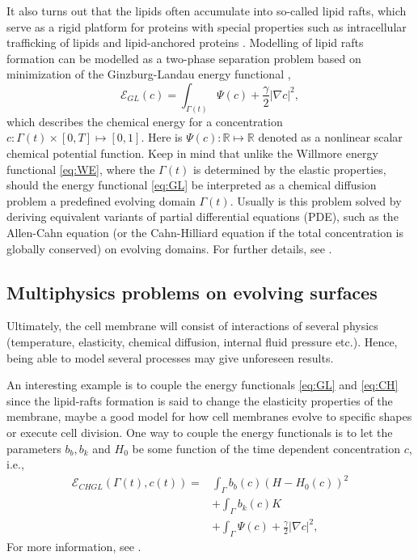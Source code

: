 It also turns out that the lipids often accumulate into so-called lipid rafts, which serve as a rigid platform for proteins with special properties such as intracellular trafficking of lipids and lipid-anchored proteins \cite{ miller2020divide}. Modelling of
lipid rafts formation can be modelled as a two-phase separation problem based on minimization of the Ginzburg-Landau energy functional \cite{yushutin19},
\begin{equation}
\label{eq:GL}
\mathcal{E}_{GL}  \left( c   \right) = \int_{\Gamma\left(t  \right)   }^{}\Psi \left( c \right) + \frac{\gamma}{2} \left\lvert \nabla c \right\rvert^{2} ,
\end{equation}
which describes the chemical energy for a concentration $c: \Gamma\left( t \right)  \times \left[ 0,T \right] \mapsto  \left[ 0,1 \right]  $. Here is $ \Psi \left( c \right): \mathbb{R} \mapsto \mathbb{R} $ denoted as a nonlinear scalar chemical potential function. Keep in mind that unlike
the Willmore energy functional \eqref{eq:WE}, where the $\Gamma\left( t \right)  $ is determined by the elastic properties, should the energy functional \eqref{eq:GL} be interpreted as a chemical diffusion problem a predefined evolving domain $\Gamma \left( t \right) $.
Usually is this problem solved by deriving equivalent variants of partial differential equations (PDE), such as the Allen-Cahn equation (or the Cahn-Hilliard equation if the total concentration is globally conserved) on evolving domains. For further details,
see \cite{yushutin19,
 ratz16,Gera2017, caetano21, elliott2015evolving}.

\subsection{Multiphysics problems on evolving surfaces}%

Ultimately, the cell membrane will consist of interactions of several physics (temperature, elasticity, chemical diffusion, internal fluid pressure etc.)\cite{udo97}. Hence, being able to model several processes may give unforeseen results.

An interesting example is to couple the energy functionals \eqref{eq:GL}  and \eqref{eq:CH} since the lipid-rafts formation is said to change the elasticity properties of the membrane, maybe a good model for how cell membranes evolve to specific shapes or execute cell division. One way
to couple the energy functionals is to let the parameters $b_{b}, b_{k}$ and $ H_{0} $ be some function of the time dependent concentration $c$, i.e.,
\[
    \begin{split}
        \mathcal{E}_{CHGL} \left( \Gamma\left( t \right) ,c\left( t \right)    \right) =  & \int_{\Gamma  }^{}  b_{b}\left( c \right)  \left( H- H_{0}\left( c \right)  \right) ^{2}  \\
        & + \int_{\Gamma   }^{} b_{k}\left( c \right)  K \\
        &+ \int_{\Gamma   }^{}\Psi \left( c \right) + \frac{\gamma}{2} \left\lvert \nabla c \right\rvert^{2} ,
    \end{split}
\]
For more information, see \cite{elliott2010surface}.

